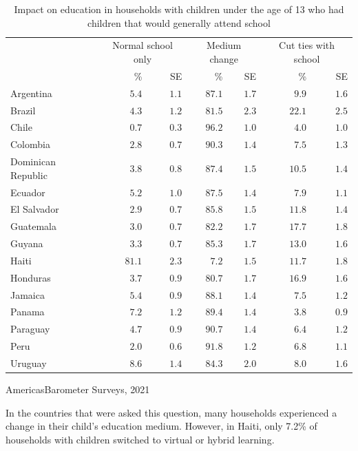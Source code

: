 \documentclass[
]{krantz}
\begin{document}
\setlength{\LTpost}{0mm}
\begin{longtable}{l|rrrrrr}
\caption{\label{tab:ambarom-covid-ed-der-tab}Impact on education in households with children under the age of 13 who had children that would generally attend school}\\
\toprule
\multicolumn{1}{l}{} & \multicolumn{2}{c}{Normal school only} & \multicolumn{2}{c}{Medium change} & \multicolumn{2}{c}{Cut ties with school} \\ 
\cmidrule(lr){2-3} \cmidrule(lr){4-5} \cmidrule(lr){6-7}
\multicolumn{1}{l}{} & \% & SE & \% & SE & \% & SE \\ 
\midrule
Argentina & $5.4$ & $1.1$ & $87.1$ & $1.7$ & $9.9$ & $1.6$ \\ 
Brazil & $4.3$ & $1.2$ & $81.5$ & $2.3$ & $22.1$ & $2.5$ \\ 
Chile & $0.7$ & $0.3$ & $96.2$ & $1.0$ & $4.0$ & $1.0$ \\ 
Colombia & $2.8$ & $0.7$ & $90.3$ & $1.4$ & $7.5$ & $1.3$ \\ 
Dominican Republic & $3.8$ & $0.8$ & $87.4$ & $1.5$ & $10.5$ & $1.4$ \\ 
Ecuador & $5.2$ & $1.0$ & $87.5$ & $1.4$ & $7.9$ & $1.1$ \\ 
El Salvador & $2.9$ & $0.7$ & $85.8$ & $1.5$ & $11.8$ & $1.4$ \\ 
Guatemala & $3.0$ & $0.7$ & $82.2$ & $1.7$ & $17.7$ & $1.8$ \\ 
Guyana & $3.3$ & $0.7$ & $85.3$ & $1.7$ & $13.0$ & $1.6$ \\ 
Haiti & $81.1$ & $2.3$ & $7.2$ & $1.5$ & $11.7$ & $1.8$ \\ 
Honduras & $3.7$ & $0.9$ & $80.7$ & $1.7$ & $16.9$ & $1.6$ \\ 
Jamaica & $5.4$ & $0.9$ & $88.1$ & $1.4$ & $7.5$ & $1.2$ \\ 
Panama & $7.2$ & $1.2$ & $89.4$ & $1.4$ & $3.8$ & $0.9$ \\ 
Paraguay & $4.7$ & $0.9$ & $90.7$ & $1.4$ & $6.4$ & $1.2$ \\ 
Peru & $2.0$ & $0.6$ & $91.8$ & $1.2$ & $6.8$ & $1.1$ \\ 
Uruguay & $8.6$ & $1.4$ & $84.3$ & $2.0$ & $8.0$ & $1.6$ \\ 
\bottomrule
\end{longtable}
\begin{minipage}{\linewidth}
AmericasBarometer Surveys, 2021\\
\end{minipage}

In the countries that were asked this question, many households experienced a change in their child's education medium. However, in Haiti, only 7.2\% of households with children switched to virtual or hybrid learning.
\end{document}
